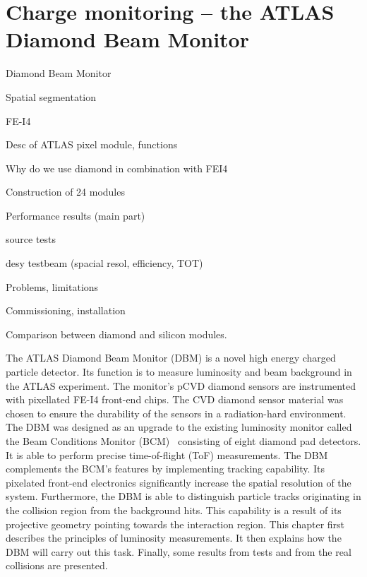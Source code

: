 \documentclass[12pt]{packages/mytustyle}  %
\begin{document}
\baselineskip=15pt



\chapter{Charge monitoring -- the ATLAS Diamond Beam Monitor}


Diamond Beam Monitor

Spatial segmentation

FE-I4

Desc of ATLAS pixel module, functions

Why do we use diamond in combination with FEI4

Construction of 24 modules

Performance results (main part)

source tests

desy testbeam (spacial resol, efficiency, TOT)

Problems, limitations

Commissioning, installation

Comparison between diamond and silicon modules.




The ATLAS Diamond Beam Monitor (DBM) is a novel high energy charged particle detector. Its function is to measure luminosity and beam background in the ATLAS experiment. The monitor's pCVD diamond sensors are instrumented with pixellated FE-I4 front-end chips. The CVD diamond sensor material was chosen to ensure the durability of the sensors in a radiation-hard environment. The DBM was designed as an upgrade to the existing luminosity monitor called the Beam Conditions Monitor (BCM)~\cite{} consisting of eight diamond pad detectors. It is able to perform precise time-of-flight (ToF) measurements. The DBM complements the BCM's features by implementing tracking capability. Its pixelated front-end electronics significantly increase the spatial resolution of the system. Furthermore, the DBM is able to distinguish particle tracks originating in the collision region from the background hits. This capability is a result of its projective geometry pointing towards the interaction region. This chapter first describes the principles of luminosity measurements. It then explains how the DBM will carry out this task. Finally, some results from tests and from the real collisions are presented. 
\end{document}
